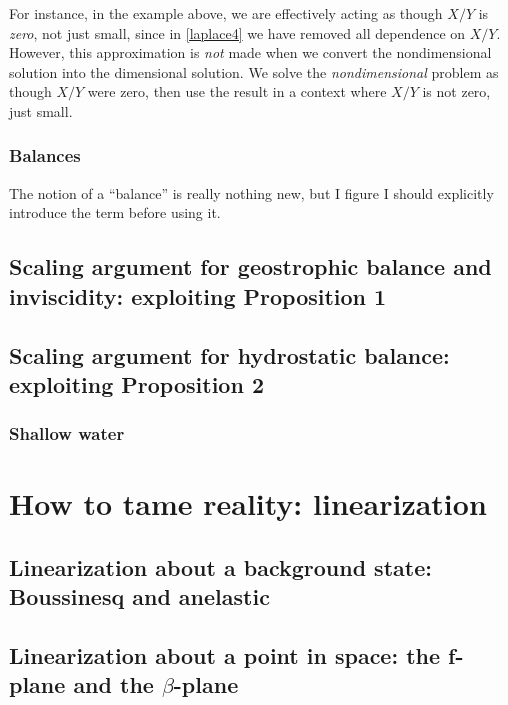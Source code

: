 \documentclass[11pt]{book}
\begin{document}
For instance, in the example above, we are effectively acting as though $X/Y$ is \emph{zero}, not just small, since in \eqref{laplace4} we have removed all dependence on $X/Y$.  However, this approximation is \emph{not} made when we convert the nondimensional solution into the dimensional solution.  We solve the \emph{nondimensional} problem as though $X/Y$ were zero, then use the result in a context where $X/Y$ is not zero, just small.
\subsubsection{Balances}
The notion of a ``balance'' is really nothing new, but I figure I should explicitly introduce the term before using it.

\subsection{Scaling argument for geostrophic balance and inviscidity: exploiting Proposition 1}

\subsection{Scaling argument for hydrostatic balance: exploiting Proposition 2}
\subsubsection{Shallow water}
\section{How to tame reality: linearization}
\subsection{Linearization about a background state: Boussinesq and anelastic}
\subsection{Linearization about a point in space: the f-plane and the $\beta$-plane}
\end{document}
